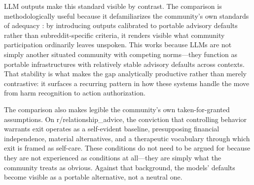 LLM outputs make this standard visible by contrast. The comparison is methodologically useful because it defamiliarizes the community's own standards of adequacy \citep{shklovsky1917art, iliadis2016critical}: by introducing outputs calibrated to portable advisory defaults rather than subreddit-specific criteria, it renders visible what community participation ordinarily leaves unspoken. This works because LLMs are not simply another situated community with competing norms---they function as portable infrastructures with relatively stable advisory defaults across contexts. That stability is what makes the gap analytically productive rather than merely contrastive: it surfaces a recurring pattern in how these systems handle the move from harm recognition to action authorization.

The comparison also makes legible the community’s own taken-for-granted assumptions. On r/relationship\_advice, the conviction that controlling behavior warrants exit operates as a self-evident baseline, presupposing financial independence, material alternatives, and a therapeutic vocabulary through which exit is framed as self-care. These conditions do not need to be argued for because they are not experienced as conditions at all---they are simply what the community treats as obvious. Against that background, the models’ defaults become visible as a portable alternative, not a neutral one.